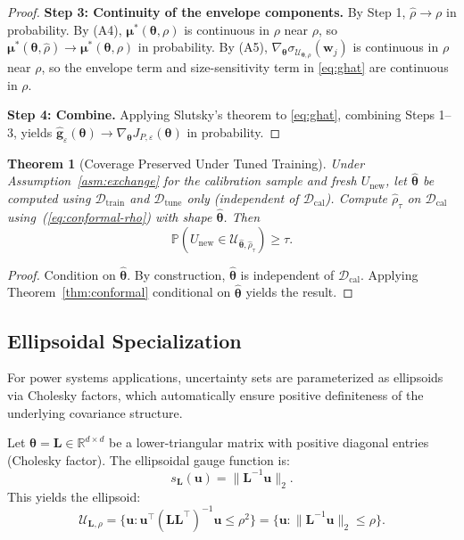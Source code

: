 \documentclass[lettersize,journal]{IEEEtran}
\newcommand{\R}{\mathbb{R}}
\newcommand{\Prob}{\mathbb{P}}
\newcommand{\cU}{\mathcal{U}}
\newcommand{\cD}{\mathcal{D}}
\newcommand{\norm}[1]{\|#1\|}
\newcommand{\btheta}{\bm{\theta}}
\newcommand{\bmu}{\bm{\mu}}
\newcommand{\bu}{\bm{u}}
\newcommand{\bw}{\bm{w}}
\newcommand{\bL}{\bm{L}}
\newcommand{\bg}{\bm{g}}
\newtheorem{theorem}{Theorem}
\theoremstyle{definition}
\begin{document}
\begin{proof}
\textbf{Step 3: Continuity of the envelope components.}
By Step 1, $\hat\rho\to\rho$ in probability. By (A4), $\bmu^*(\btheta,\rho)$ is continuous in $\rho$ near $\rho$,
so $\bmu^*(\btheta,\hat\rho)\to\bmu^*(\btheta,\rho)$ in probability.
By (A5), $\nabla_{\btheta}\sigma_{\cU_{\btheta,\rho}}(\bw_j)$ is continuous in $\rho$ near $\rho$,
so the envelope term and size-sensitivity term in \eqref{eq:ghat} are continuous in $\rho$.

\textbf{Step 4: Combine.}
Applying Slutsky's theorem to \eqref{eq:ghat}, combining Steps 1--3, yields
$\hat{\bg}_\varepsilon(\btheta)\to \nabla_{\btheta}J_{P,\varepsilon}(\btheta)$ in probability.
\end{proof}

\begin{theorem}[Coverage Preserved Under Tuned Training]\label{thm:coverage-preserved}
Under Assumption~\ref{asm:exchange} for the calibration sample and fresh $U_{\text{new}}$, let $\hat{\btheta}$ be computed using $\cD_{\text{train}}$ and $\cD_{\text{tune}}$ only (independent of $\cD_{\text{cal}}$). Compute $\hat{\rho}_\tau$ on $\cD_{\text{cal}}$ using~(\ref{eq:conformal-rho}) with shape $\hat{\btheta}$. Then
\begin{equation}
\Prob(U_{\text{new}} \in \cU_{\hat{\btheta}, \hat{\rho}_\tau}) \geq \tau.
\end{equation}
\end{theorem}

\begin{proof}
Condition on $\hat{\btheta}$. By construction, $\hat{\btheta}$ is independent of $\cD_{\text{cal}}$. Applying Theorem~\ref{thm:conformal} conditional on $\hat{\btheta}$ yields the result.
\end{proof}

\subsection{Ellipsoidal Specialization}

For power systems applications, uncertainty sets are parameterized as ellipsoids via Cholesky factors, which automatically ensure positive definiteness of the underlying covariance structure.

Let $\btheta = \bL \in \R^{d \times d}$ be a lower-triangular matrix with positive diagonal entries (Cholesky factor). The ellipsoidal gauge function is:
\begin{equation}
s_{\bL}(\bu) = \norm{\bL^{-1} \bu}_2.
\end{equation}
This yields the ellipsoid:
\begin{equation}
\cU_{\bL,\rho} = \{\bu : \bu^\top (\bL\bL^\top)^{-1} \bu \leq \rho^2\} = \{\bu : \norm{\bL^{-1}\bu}_2 \leq \rho\}.
\end{equation}
\end{document}
